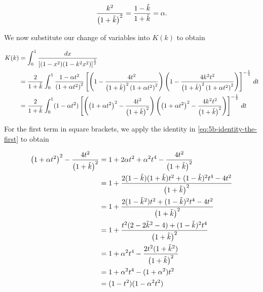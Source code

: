 \begin{solution}
  \begin{equation} \label{eq:5b-identity-the-second}
    \frac{k^2}{\left(1 + \tilde{k}\right)^2} = \frac{1 - \tilde{k}}{1 + \tilde{k}} = \alpha.
  \end{equation}

  We now substitute our change of variables into $K(k)$ to obtain

  \begin{align*}
    K(k) &= \int_0^1 \frac{dx}{\left[(1 - x^2) (1 - k^2 x^2) \right]^{\frac{1}{2}}} \\
         &= \frac{2}{1 + \tilde{k}} \int_0^1 \frac{1 - \alpha t^2}{\left(1 + \alpha t^2\right)^2}
            \left[
              \left(
                1 - \frac{4t^2}{\left(1 + \tilde{k} \right)^2 \left(1 + \alpha t^2 \right)^2}
              \right)
              \left(
                1 - \frac{4k^2t^2}{\left(1 + \tilde{k} \right)^2 \left(1 + \alpha t^2 \right)^2}
              \right)
            \right]^{-\frac{1}{2}} \, dt \\
         &= \frac{2}{1 + \tilde{k}} \int_0^1 (1 - \alpha t^2)
            \left[
              \left(
                \left(1 + \alpha t^2\right)^2 - \frac{4t^2}{\left(1 + \tilde{k} \right)^2}
              \right)
              \left(
                \left(1 + \alpha t^2\right)^2 - \frac{4k^2t^2}{\left(1 + \tilde{k} \right)^2}
              \right)
            \right]^{-\frac{1}{2}} \, dt
  \end{align*}

  For the first term in square brackets, we apply the identity in \eqref{eq:5b-identity-the-first} to obtain

  \begin{align*}
    \left(1 + \alpha t^2\right)^2 - \frac{4t^2}{\left(1 + \tilde{k} \right)^2} 
      &= 1 + 2 \alpha t^2 + \alpha^2 t^4 - \frac{4t^2}{\left(1 + \tilde{k} \right)^2} \\ 
      &= 1 + \frac{2 (1 - \tilde{k})(1 + \tilde{k}) t^2 + (1 - \tilde{k})^2 t^4 - 4t^2}{\left(1 + \tilde{k} \right)^2} \\ 
      &= 1 + \frac{2 (1 - \tilde{k}^2) t^2 + (1 - \tilde{k})^2 t^4 - 4t^2}{\left(1 + \tilde{k} \right)^2} \\ 
      &= 1 + \frac{t^2(2 - 2\tilde{k}^2 - 4) + (1 - \tilde{k})^2 t^4}{\left(1 + \tilde{k} \right)^2} \\ 
      &= 1 + \alpha^2 t^4 - \frac{2 t^2(1 + \tilde{k}^2)}{\left(1 + \tilde{k} \right)^2} \\ 
      &= 1 + \alpha^2 t^4 - (1 + \alpha^2) t^2 \\
      &= (1 - t^2)(1 - \alpha^2 t^2)
  \end{align*}


\end{solution}
